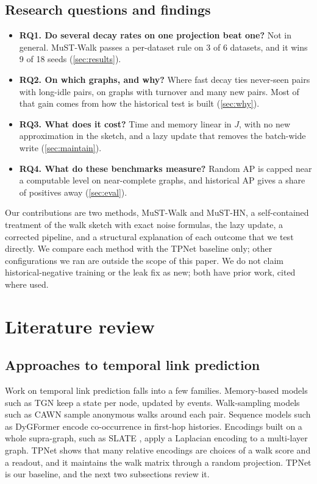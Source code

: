 \documentclass[11pt,a4paper]{article}
\theoremstyle{plain}
\theoremstyle{definition}
\begin{document}
\subsection{Research questions and findings}
\begin{itemize}\itemsep1pt
\item \textbf{RQ1. Do several decay rates on one projection beat one?} Not in general. MuST-Walk passes a per-dataset rule on 3 of 6 datasets, and it wins 9 of 18 seeds (\cref{sec:results}).
\item \textbf{RQ2. On which graphs, and why?} Where fast decay ties never-seen pairs with long-idle pairs, on graphs with turnover and many new pairs. Most of that gain comes from how the historical test is built (\cref{sec:why}).
\item \textbf{RQ3. What does it cost?} Time and memory linear in $J$, with no new approximation in the sketch, and a lazy update that removes the batch-wide write (\cref{sec:maintain}).
\item \textbf{RQ4. What do these benchmarks measure?} Random AP is capped near a computable level on near-complete graphs, and historical AP gives a share of positives away (\cref{sec:eval}).
\end{itemize}
Our contributions are two methods, MuST-Walk and MuST-HN, a self-contained treatment of the walk sketch with exact noise formulas, the lazy update, a corrected pipeline, and a structural explanation of each outcome that we test directly. We compare each method with the TPNet baseline only; other configurations we ran are outside the scope of this paper. We do not claim historical-negative training or the leak fix as new; both have prior work, cited where used.

\section{Literature review}\label{sec:lit}
\subsection{Approaches to temporal link prediction}
Work on temporal link prediction falls into a few families. Memory-based models such as TGN \cite{tgn} keep a state per node, updated by events. Walk-sampling models such as CAWN \cite{cawn} sample anonymous walks around each pair. Sequence models such as DyGFormer \cite{dygformer} encode co-occurrence in first-hop histories. Encodings built on a whole supra-graph, such as SLATE \cite{slate}, apply a Laplacian encoding to a multi-layer graph. TPNet \cite{tpnet} shows that many relative encodings are choices of a walk score and a readout, and it maintains the walk matrix through a random projection. TPNet is our baseline, and the next two subsections review it.
\end{document}
